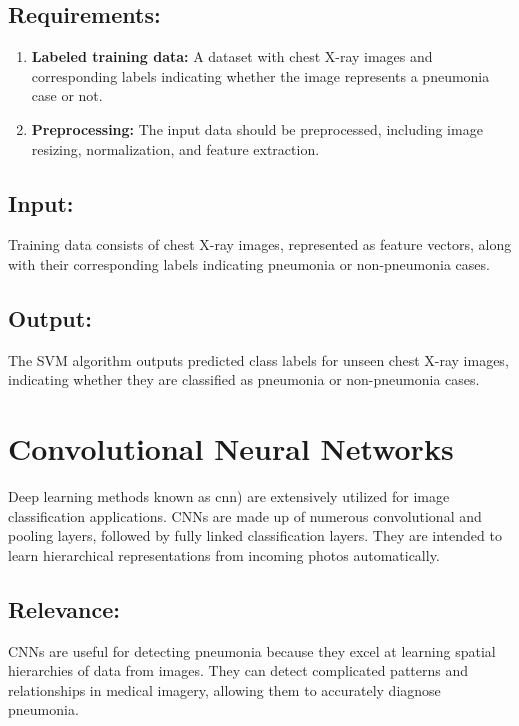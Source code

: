 \subsection{Requirements:}
\begin{enumerate}
	\item \textbf{Labeled training data:} A dataset with chest X-ray images and corresponding labels indicating whether the image represents a pneumonia case or not.\\
	\item \textbf{Preprocessing:} The input data should be preprocessed, including image resizing, normalization, and feature extraction.\\
\end{enumerate}

\subsection{Input:}
Training data consists of chest X-ray images, represented as feature vectors, along with their corresponding labels indicating pneumonia or non-pneumonia cases.\\

\subsection{Output:}
The SVM algorithm outputs predicted class labels for unseen chest X-ray images, indicating whether they are classified as pneumonia or non-pneumonia cases.\\


\section{Convolutional Neural Networks}

Deep learning methods known as \ac{cnn}) are extensively utilized for image classification applications. CNNs are made up of numerous convolutional and pooling layers, followed by fully linked classification layers. They are intended to learn hierarchical representations from incoming photos automatically.\autocite{lecun:1998}

\subsection{Relevance:}

CNNs are useful for detecting pneumonia because they excel at learning spatial hierarchies of data from images. They can detect complicated patterns and relationships in medical imagery, allowing them to accurately diagnose pneumonia.\\


